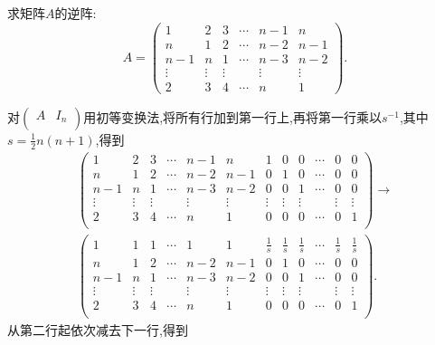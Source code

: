 \documentclass[../../main.tex]{subfiles}%
\begin{document}
\begin{example}
求矩阵\(A\)的逆阵:
\[
A = 
\begin{pmatrix}
1 & 2 & 3 & \cdots & n - 1 & n \\
n & 1 & 2 & \cdots & n - 2 & n - 1 \\
n - 1 & n & 1 & \cdots & n - 3 & n - 2 \\
\vdots & \vdots & \vdots & & \vdots & \vdots \\
2 & 3 & 4 & \cdots & n & 1
\end{pmatrix}.
\]
\end{example}
\begin{solution}

对\(\left( \begin{matrix}
A&		I_n\\
\end{matrix} \right) \)用初等变换法,将所有行加到第一行上,再将第一行乘以\(s^{-1}\),其中\(s = \frac{1}{2}n(n + 1)\),得到
\setcounter{MaxMatrixCols}{20} %
\begin{gather*}
\left( \begin{matrix}
1&		2&		3&		\cdots&		n-1&		n&		1&		0&		0&		\cdots&		0&		0\\
n&		1&		2&		\cdots&		n-2&		n-1&		0&		1&		0&		\cdots&		0&		0\\
n-1&		n&		1&		\cdots&		n-3&		n-2&		0&		0&		1&		\cdots&		0&		0\\
\vdots&		\vdots&		\vdots&		&		\vdots&		\vdots&		\vdots&		\vdots&		\vdots&		&		\vdots&		\vdots\\
2&		3&		4&		\cdots&		n&		1&		0&		0&		0&		\cdots&		0&		1\\
\end{matrix} \right) \rightarrow
\\
\left( \begin{matrix}
1&		1&		1&		\cdots&		1&		1&		\frac{1}{s}&		\frac{1}{s}&		\frac{1}{s}&		\cdots&		\frac{1}{s}&		\frac{1}{s}\\
n&		1&		2&		\cdots&		n-2&		n-1&		0&		1&		0&		\cdots&		0&		0\\
n-1&		n&		1&		\cdots&		n-3&		n-2&		0&		0&		1&		\cdots&		0&		0\\
\vdots&		\vdots&		\vdots&		&		\vdots&		\vdots&		\vdots&		\vdots&		\vdots&		&		\vdots&		\vdots\\
2&		3&		4&		\cdots&		n&		1&		0&		0&		0&		\cdots&		0&		1\\
\end{matrix} \right) .
\end{gather*}
从第二行起依次减去下一行,得到

\end{solution}
\end{document}
